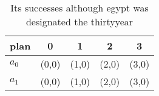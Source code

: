 \documentclass[a4paper]{article}
\begin{document}
\begin{table}
\begin{adjustbox}{width=0.5\columnwidth}
\begin{tabular}{|l|l|l|l|l|}
\hline
\textbf{plan} & \multicolumn{1}{c|}{\textbf{0}} & \multicolumn{1}{c|}{\textbf{1}} & \multicolumn{1}{c|}{\textbf{2}} & \multicolumn{1}{c|}{\textbf{3}} \\ \hline
\textbf{$a_0$}  & (0,0) & (1,0) & (2,0) & (3,0) \\ \hline
\textbf{$a_1$}  & (0,0) & (1,0) & (2,0) & (3,0) \\ \hline
\end{tabular}
\end{adjustbox}
\caption{Its successes although egypt was designated the thirtyyear 
}
\end{table}
\end{document}
